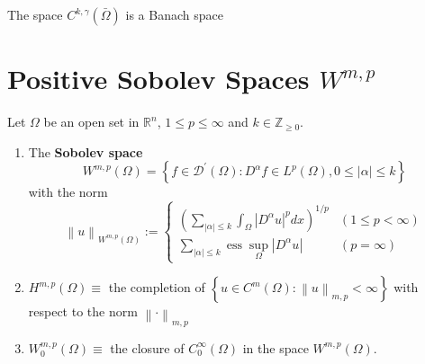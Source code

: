 \begin{theorem}
    The space $C^{k,\gamma}(\bar{\Omega})$ is a Banach space
\end{theorem}



\section{Positive Sobolev Spaces $W^{m,p}$} %
\begin{definition}
    Let $\Omega$ be an open set in $\mathbb{R}^n$, $1\leq p \leq \infty$ and $k\in \mathbb{Z}_{\geq 0}$.
    \begin{enumerate}
        \item
              The \textbf{Sobolev space}
              \begin{equation*}
                  W^{m,p}\left(\Omega\right)
                  =
                  \left\{f \in \mathscr{D}^\prime\left(\Omega\right): D^\alpha f \in L^p\left(\Omega\right),0\leq  \left|\alpha\right| \leq k\right\}
              \end{equation*}
              with the norm
              \begin{equation*}
                  \left\| u \right\|_{W^{m,p}\left(\Omega\right)}
                  :=
                  \begin{cases}
                      \left(\sum_{\left|\alpha\right| \leq k} \int_\Omega\left|D^\alpha u\right|^p d x\right)^{1 / p} & (1 \leq p<\infty) \\ \sum_{\left|\alpha\right| \leq k} \operatorname{ess}\sup \limits_\Omega\left|D^\alpha u\right| & (p=\infty)
                  \end{cases}
              \end{equation*}
        \item
              \( H^{m,p}\left(\Omega\right) \equiv \) the completion of \(\left\{ u \in C^m\left(\Omega\right) : \left\| u \right\|_{m,p} < \infty \right\}\) with respect to the norm \(\left\| \cdot \right\|_{m,p}\)

        \item
              \( W_0^{m,p}\left(\Omega\right) \equiv \) the closure of \(C_0^{\infty}\left(\Omega\right)\) in the space \(W^{m,p}\left(\Omega\right)\).
    \end{enumerate}
\end{definition}
